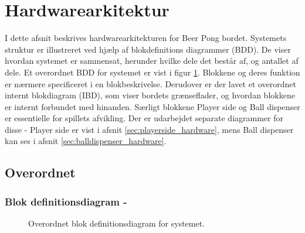 \documentclass[Arkitektur/System_main.tex]{subfiles}
\begin{document}
\section{Hardwarearkitektur} \label{sec:hardware_arkitektur}

I dette afsnit beskrives hardwarearkitekturen for Beer Pong bordet. Systemets struktur er illustreret ved hjælp af blokdefinitions diagrammer (BDD). De viser hvordan systemet er sammensat, herunder hvilke dele det består af, og antallet af dele. Et overordnet BDD for systemet er vist i figur \ref{fig:overall_hardware_bdd}. Blokkene og deres funktion er nærmere specificeret i en blokbeskrivelse. Derudover er der lavet et overordnet internt blokdiagram (IBD), som viser bordets grænseflader, og hvordan blokkene er internt forbundet med hinanden. Særligt blokkene Player side og Ball dispenser er essentielle for spillets afvikling. Der er udarbejdet separate diagrammer for disse - Player side er vist i afsnit \ref{sec:playerside_hardware}, mens Ball dispenser kan ses i afsnit \ref{sec:balldispenser_hardware}.

\subsection{Overordnet} \label{sec:overall_hardware}
\subsubsection{Blok definitionsdiagram - } \label{sec:overall_hardware_bdd}
\begin{figure}[H]
    \centering
    \caption{Overordnet blok definitionsdiagram for systemet.}
    \label{fig:overall_hardware_bdd}
\end{figure}
\end{document}
